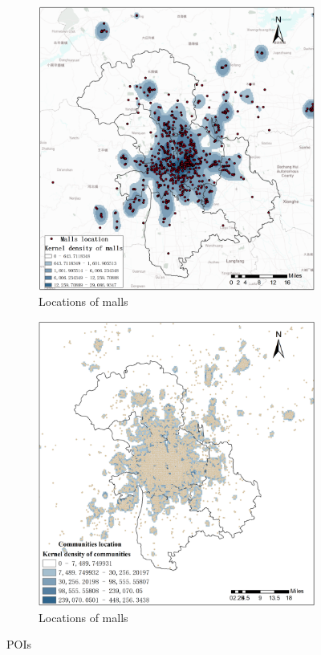 \documentclass[preprints,ijgi,submit,moreauthors]{Definitions/mdpi}
\begin{document}
\begin{figure}[H]
    \begin{subfigure}{.4\textwidth}
        \includegraphics[width=\textwidth]{Figures/Plot_location_POIs(malls).png}
        \caption{Locations of malls}
    \end{subfigure}
    \begin{subfigure}{.4\textwidth}
        \includegraphics[width=\textwidth]{Figures/Plot_location_POIs(communities).png}
        \caption{Locations of malls}
    \end{subfigure}
    \centering
    \caption{POIs}
    \label{fig:POIs' location}
\end{figure}
\end{document}
